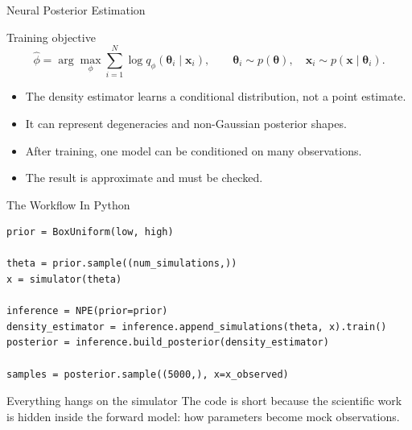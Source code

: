 \documentclass[aspectratio=169,11pt]{beamer}
\newcommand{\tightlist}{\setlength{\itemsep}{0.35em}}
\begin{document}
\begin{frame}{Neural Posterior Estimation}
  \begin{block}{Training objective}
    \[
      \hat{\phi}
      =
      \arg\max_\phi
      \sum_{i=1}^{N}
      \log q_\phi(\bm{\theta}_i\mid \bm{x}_i),
      \qquad
      \bm{\theta}_i\sim p(\bm{\theta}),\quad
      \bm{x}_i\sim p(\bm{x}\mid\bm{\theta}_i).
    \]
  \end{block}

  \begin{itemize}\tightlist
    \item The density estimator learns a conditional distribution, not a point estimate.
    \item It can represent degeneracies and non-Gaussian posterior shapes.
    \item After training, one model can be conditioned on many observations.
    \item The result is approximate and must be checked.
  \end{itemize}
\end{frame}

\begin{frame}[fragile]{The Workflow In Python}
  \begin{lstlisting}[style=python-dark]
prior = BoxUniform(low, high)

theta = prior.sample((num_simulations,))
x = simulator(theta)

inference = NPE(prior=prior)
density_estimator = inference.append_simulations(theta, x).train()
posterior = inference.build_posterior(density_estimator)

samples = posterior.sample((5000,), x=x_observed)
  \end{lstlisting}

  \vspace{0.15cm}
  \begin{block}{Everything hangs on the simulator}
    The code is short because the scientific work is hidden inside the forward
    model: how parameters become mock observations.
  \end{block}
\end{frame}
\end{document}
